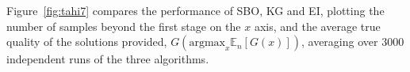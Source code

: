 \documentclass{article}
\newcommand{\w}{w}
\newcommand{\z}{z}
\newcommand{\pfcomment}[1]{{\color{red} PF: #1}}
\begin{document}
Figure~\ref{fig:tahi7} compares the performance of SBO, KG and EI, plotting the number of samples beyond the first stage on the $x$ axis, and the average true quality of the solutions provided, $G(\mathrm{argmax}_x \mathbb{E}_n[G(x)])$, averaging over 3000 independent runs of the three algorithms.



\[
\]
\end{document}
